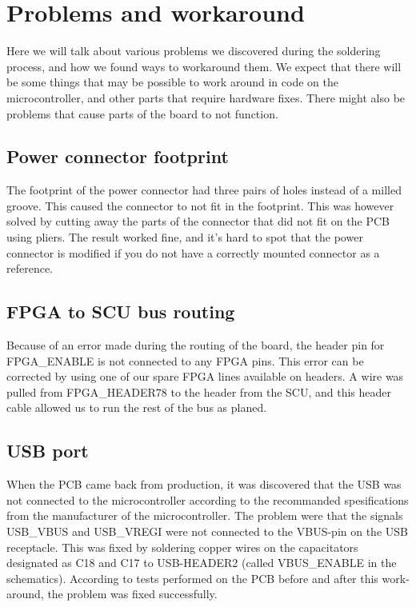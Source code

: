 \section {Problems and workaround}
Here we will talk about various problems we discovered during the soldering process, and how we found ways to workaround them.
We expect that there will be some things that may be possible to work around in code on the microcontroller, and other parts that require hardware fixes.
There might also be problems that cause parts of the board to not function.

\subsection{ Power connector footprint }

The footprint of the power connector had three pairs of holes instead of a milled groove.
This caused the connector to not fit in the footprint.
This was however solved by cutting away the parts of the connector that did not fit on the PCB using pliers.
The result worked fine, and it's hard to spot that the power connector is modified if you do not have a correctly mounted connector as a reference.

\subsection{ FPGA to SCU bus routing }

Because of an error made during the routing of the board, the header pin for FPGA\_ENABLE is not connected to any FPGA pins.
This error can be corrected by using one of our spare FPGA lines available on headers.
A wire was pulled from FPGA\_HEADER78 to the header from the SCU, and this header cable allowed us to run the rest of the bus as planed.

\subsection{ USB port }
When the PCB came back from production, it was discovered that the USB was not connected to the microcontroller
according to the recommanded spesifications from the manufacturer of the microcontroller. 
The problem were that the signals USB\_VBUS and USB\_VREGI were not connected to the VBUS-pin on the USB receptacle. This was fixed by soldering copper wires on the capacitators designated as C18 and C17 to USB-HEADER2 (called VBUS\_ENABLE in the schematics).
According to tests performed on the PCB before and after this work-around, the problem was fixed successfully.


